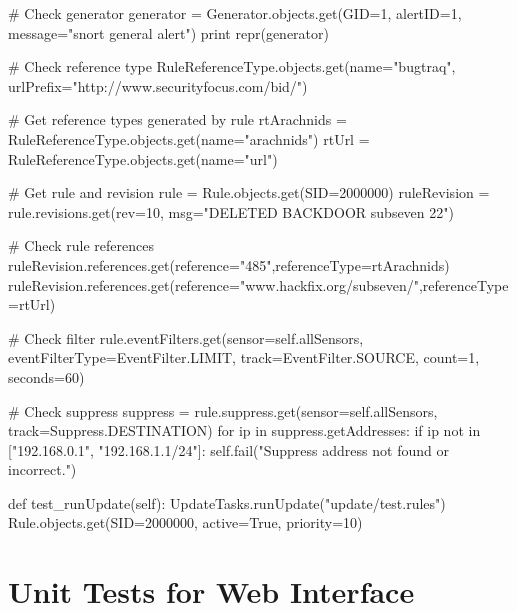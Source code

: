 \begin{python}[breaklines=true]
    # Check generator
    generator = Generator.objects.get(GID=1, alertID=1, message="snort general alert")
    print repr(generator)
    
    # Check reference type
    RuleReferenceType.objects.get(name="bugtraq", urlPrefix="http://www.securityfocus.com/bid/")
    
    # Get reference types generated by rule
    rtArachnids = RuleReferenceType.objects.get(name="arachnids")
    rtUrl = RuleReferenceType.objects.get(name="url")
    
    # Get rule and revision
    rule = Rule.objects.get(SID=2000000)
    ruleRevision = rule.revisions.get(rev=10, msg="DELETED BACKDOOR subseven 22")
    
    # Check rule references   
    ruleRevision.references.get(reference="485",referenceType=rtArachnids)
    ruleRevision.references.get(reference="www.hackfix.org/subseven/",referenceType=rtUrl)
    
    # Check filter
    rule.eventFilters.get(sensor=self.allSensors, eventFilterType=EventFilter.LIMIT, track=EventFilter.SOURCE, count=1, seconds=60)
    
    # Check suppress
    suppress = rule.suppress.get(sensor=self.allSensors, track=Suppress.DESTINATION)
    for ip in suppress.getAddresses:
      if ip not in ["192.168.0.1", "192.168.1.1/24"]:
        self.fail("Suppress address not found or incorrect.")
    
  def test_runUpdate(self):
    UpdateTasks.runUpdate("update/test.rules")
    Rule.objects.get(SID=2000000, active=True, priority=10)
\end{python}

\section{Unit Tests for Web Interface}

